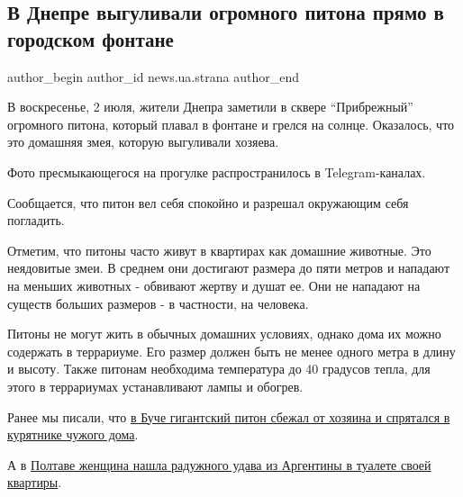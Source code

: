 
 
 
 
 
 
\subsection{В Днепре выгуливали огромного питона прямо в городском фонтане}
\label{sec:02_07_2023.stz.news.ua.strana.1.piton_zoopark}
 
\ifcmt
 author_begin
   author_id news.ua.strana
 author_end
\fi

В воскресенье, 2 июля, жители Днепра заметили в сквере \enquote{Прибрежный} огромного
питона, который плавал в фонтане и грелся на солнце. Оказалось, что это
домашняя змея, которую выгуливали хозяева.


Фото пресмыкающегося на прогулке распространилось в Telegram-каналах.

Сообщается, что питон вел себя спокойно и разрешал окружающим себя погладить.

Отметим, что питоны часто живут в квартирах как домашние животные. Это
неядовитые змеи. В среднем они достигают размера до пяти метров и нападают на
меньших животных - обвивают жертву и душат ее. Они не нападают на существ
больших размеров - в частности, на человека.

Питоны не могут жить в обычных домашних условиях, однако дома их можно
содержать в террариуме. Его размер должен быть не менее одного метра в длину и
высоту. Также питонам необходима температура до 40 градусов тепла, для этого в
террариумах устанавливают лампы и обогрев.


Ранее мы писали, что
\href{https://strana.news/news/404402-v-buche-pod-kievom-v-kurjatnik-zapolz-ohromnyj-piton-foto.html}{в
Буче гигантский питон сбежал от хозяина и спрятался в курятнике чужого дома}.

А в \href{https://strana.news/news/349654-v-poltave-zhenshchina-nashla-raduzhnoho-udava-iz-arhentiny-v-tualete-kvartiry.html}{Полтаве женщина нашла радужного удава из Аргентины в туалете своей
квартиры}.
